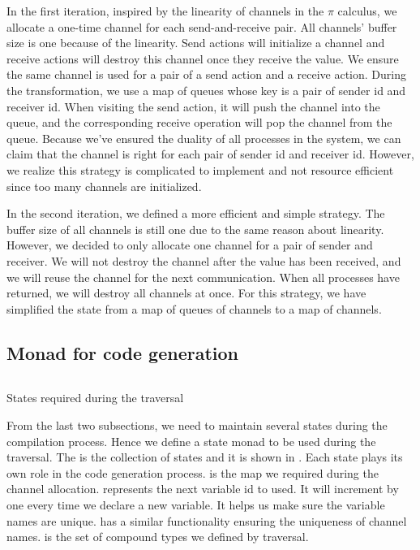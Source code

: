 In the first iteration, inspired by the linearity of channels in the $\pi$ calculus, we allocate a one-time channel for each send-and-receive pair. All channels' buffer size is one because of the linearity. Send actions will initialize a channel and receive actions will destroy this channel once they receive the value. We ensure the same channel is used for a pair of a send action and a receive action. During the transformation, we use a map of queues whose key is a pair of sender id and receiver id. When visiting the send action, it will push the channel into the queue, and the corresponding receive operation will pop the channel from the queue. Because we've ensured the duality of all processes in the system, we can claim that the channel is right for each pair of sender id and receiver id. However, we realize this strategy is complicated to implement and not resource efficient since too many channels are initialized.

In the second iteration, we defined a more efficient and simple strategy. The buffer size of all channels is still one due to the same reason about linearity. However, we decided to only allocate one channel for a pair of sender and receiver. We will not destroy the channel after the value has been received, and we will reuse the channel for the next communication. When all processes have returned, we will destroy all channels at once. For this strategy, we have simplified the state from a map of queues of channels to a map of channels.
\subsection{Monad for code generation}
\begin{listing}[ht]
    \inputminted{Haskell}{codegen/monad.hs} 
    \caption{States required during the traversal}
    \label{codegen:code:monad}
\end{listing}
From the last two subsections, we need to maintain several states during the compilation process. Hence we define a state monad to be used during the traversal. The  is the collection of states and it is shown in . Each state plays its own role in the code generation process.  is the map we required during the channel allocation.  represents the next variable id to used. It will increment by one every time we declare a new variable. It helps us make sure the variable names are unique.  has a similar functionality ensuring the uniqueness of channel names.  is the set of compound types we defined by traversal.

